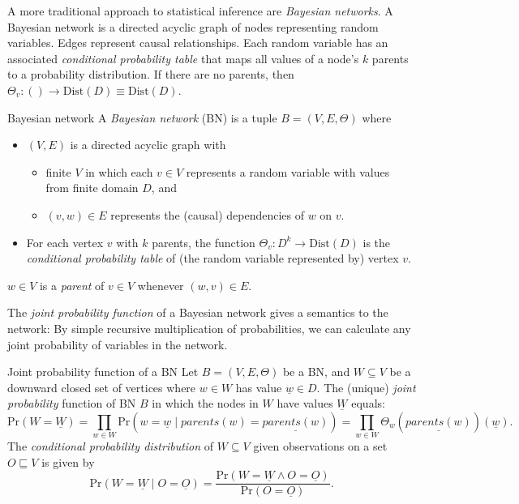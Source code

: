 \documentclass[english]{panikzettel}
\newcommand{\Dist}{\mathrm{Dist}}
\renewcommand{\Pr}{\mathrm{Pr}}
\begin{document}
A more traditional approach to statistical inference are \emph{Bayesian networks}.
A Bayesian network is a directed acyclic graph of nodes representing random variables.
Edges represent causal relationships.
Each random variable has an associated \emph{conditional probability table} that maps all values of a node's $k$ parents to a probability distribution.
If there are no parents, then $\Theta_v : () \to \Dist(D) \equiv \Dist(D)$.

\begin{defi}{Bayesian network}
	A \emph{Bayesian network} (BN) is a tuple $B=(V,E,\Theta)$ where
	\begin{itemize}
		\item $(V,E)$ is a directed acyclic graph with
		      \begin{itemize}
			      \item finite $V$ in which each $v \in V$ represents a random variable with values from finite domain $D$, and
			      \item $(v,w) \in E$ represents the (causal) dependencies of $w$ on $v$.
		      \end{itemize}
		\item For each vertex $v$ with $k$ parents, the function $\Theta_v: D^k \to \Dist(D)$ is the \emph{conditional probability table} of (the random variable represented by) vertex $v$.
	\end{itemize}
	$w \in V$ is a \emph{parent} of $v \in V$ whenever $(w,v) \in E$.
\end{defi}

The \emph{joint probability function} of a Bayesian network gives a semantics to the network: By simple recursive multiplication of probabilities, we can calculate any joint probability of variables in the network.

\begin{defi}{Joint probability function of a BN}
	Let $B=(V,E,\Theta)$ be a BN, and $W \subseteq V$ be a downward closed set of vertices where $w \in W$ has value $\underline{w} \in D$. The (unique) \emph{joint probability} function of BN $B$ in which the nodes in $W$ have values $\underline{W}$ equals:
	$$\Pr(W=\underline{W})= \prod_{w \in W} \Pr(w = \underline{w} \mid parents(w)=\underline{parents(w)})=\prod_{w \in W} \Theta_w(\underline{parents(w)})(\underline{w}).$$
	The \emph{conditional probability distribution} of $W \subseteq V$ given observations on a set $O \sqsubseteq V$ is given by $$\Pr(W= \underline{W} \mid O = \underline{O})=\frac{\Pr(W= \underline{W} \land O = \underline{O})}{\Pr(O= \underline{O})}.$$
\end{defi}
\end{document}
